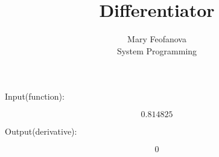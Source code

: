 \documentclass[12pt]{article}
\begin{document}
\title{Differentiator}
\author{Mary Feofanova\\
System Programming}
 
\maketitle
\begin{center}
Input(function):
\end{center}
$$0.814825$$
\begin{center}
Output(derivative):
\end{center}
$$0$$
\end{document}
